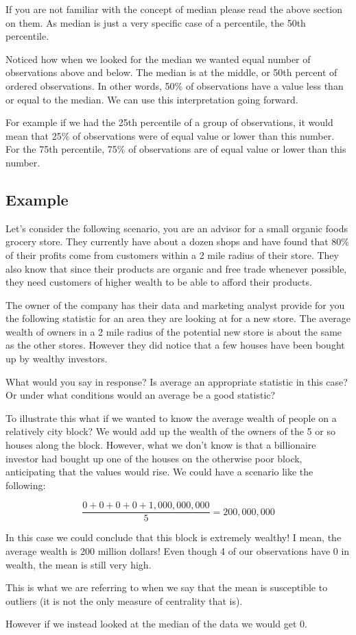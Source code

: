 \documentclass[
]{book}
\begin{document}
If you are not familiar with the concept of median please read the above section on them. As median is just a very specific case of a percentile, the 50th percentile.

Noticed how when we looked for the median we wanted equal number of observations above and below. The median is at the middle, or 50th percent of ordered observations. In other words, 50\% of observations have a value less than or equal to the median. We can use this interpretation going forward.

For example if we had the 25th percentile of a group of observations, it would mean that 25\% of observations were of equal value or lower than this number. For the 75th percentile, 75\% of observations are of equal value or lower than this number.

\hypertarget{example-1}{%
\subsection{Example}\label{example-1}}

Let's consider the following scenario, you are an advisor for a small organic foods grocery store. They currently have about a dozen shops and have found that 80\% of their profits come from customers within a 2 mile radius of their store. They also know that since their products are organic and free trade whenever possible, they need customers of higher wealth to be able to afford their products.

The owner of the company has their data and marketing analyst provide for you the following statistic for an area they are looking at for a new store. The average wealth of owners in a 2 mile radius of the potential new store is about the same as the other stores. However they did notice that a few houses have been bought up by wealthy investors.

What would you say in response? Is average an appropriate statistic in this case? Or under what conditions would an average be a good statistic?

To illustrate this what if we wanted to know the average wealth of people on a relatively city block? We would add up the wealth of the owners of the 5 or so houses along the block. However, what we don't know is that a billionaire investor had bought up one of the houses on the otherwise poor block, anticipating that the values would rise. We could have a scenario like the following:

\[\frac{0 + 0 + 0 + 0 + 1,000,000,000}{5}=200,000,000\]

In this case we could conclude that this block is extremely wealthy! I mean, the average wealth is 200 million dollars! Even though 4 of our observations have 0 in wealth, the mean is still very high.

This is what we are referring to when we say that the mean is susceptible to outliers (it is not the only measure of centrality that is).

However if we instead looked at the median of the data we would get 0.
\end{document}
